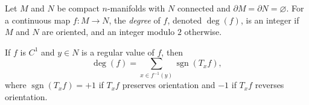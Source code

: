 Let $M$ and $N$ be compact $n$-manifolds with $N$ connected and $\partial M = \partial N = \varnothing$. For a continuous map $f: M \to N$, the \textit{degree} of $f$, denoted $\deg(f)$, is an integer if $M$ and $N$ are oriented, and an integer modulo $2$ otherwise.

If $f$ is $C^1$ and $y \in N$ is a regular value of $f$, then
$$\deg(f) = \sum_{x \in f^{-1}(y)} \operatorname{sgn}(T_x f),$$
where $\operatorname{sgn}(T_x f) = +1$ if $T_x f$ preserves orientation and $-1$ if $T_x f$ reverses orientation.
